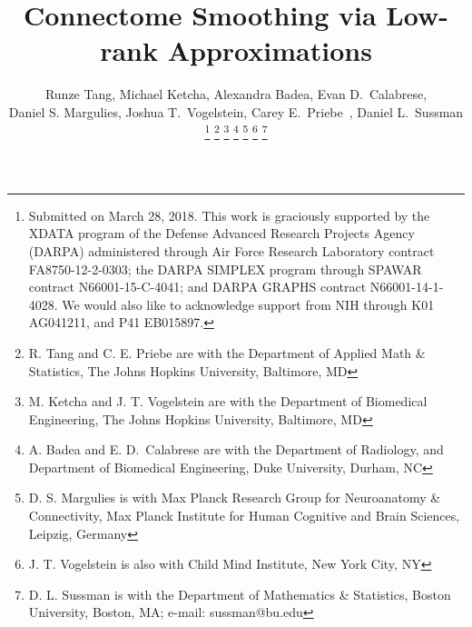 \documentclass[journal,twoside,web]{ieeecolor}
\date{}
\begin{document}
\title{Connectome Smoothing via Low-rank Approximations}
\author{Runze Tang,
Michael Ketcha,
Alexandra Badea, 
Evan D.~Calabrese,\\
Daniel S. Margulies,
Joshua T.~Vogelstein,
Carey E.~Priebe~,
Daniel L.~Sussman%
\thanks{
Submitted on March 28, 2018.
This work is graciously supported by the XDATA program of the Defense
Advanced Research Projects Agency (DARPA) administered through Air
Force Research Laboratory contract FA8750-12-2-0303; the DARPA SIMPLEX
program through SPAWAR contract N66001-15-C-4041; and DARPA GRAPHS
contract N66001-14-1-4028. We would also like to acknowledge support from NIH through K01 AG041211, and P41 EB015897.}
\thanks{R. Tang and C. E. Priebe are with the Department of Applied Math \& Statistics, The Johns Hopkins University, Baltimore, MD}
\thanks{M. Ketcha and J. T. Vogelstein are with the Department of Biomedical Engineering,  The Johns Hopkins University, Baltimore, MD}
\thanks{A. Badea and E. D.~Calabrese are with the Department of Radiology, and Department of Biomedical Engineering, Duke University, Durham, NC}
\thanks{D. S. Margulies is with Max Planck Research Group for Neuroanatomy \& Connectivity, Max Planck Institute for Human Cognitive and Brain Sciences, Leipzig, Germany}
\thanks{J. T. Vogelstein is also with Child Mind Institute, New York City, NY}
\thanks{D. L. Sussman is with the Department of Mathematics \& Statistics, Boston University, Boston, MA; e-mail: sussman@bu.edu}}









\maketitle
\end{document}
